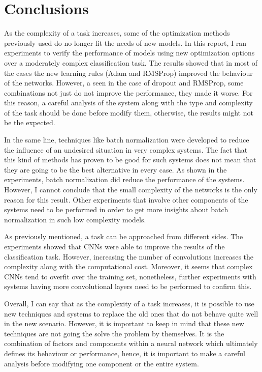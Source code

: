\documentclass{article}
\begin{document}
\section{Conclusions}
\label{sec:concl}

As the complexity of a task increases, some of the optimization methods previously used do no longer fit the needs of new models. In this report, I ran experiments to verify the performance of models using new optimization options over a moderately complex classification task. The results showed that in most of the cases the new learning rules (Adam and RMSProp) improved the behaviour of the networks. However, a seen in the case of dropout and RMSProp, some combinations not just do not improve the performance, they made it worse. For this reason, a careful analysis of the system along with the type and complexity of the task should be done before modify them, otherwise, the results might not be the expected.

In the same line, techniques like batch normalization were developed to reduce the influence of an undesired situation in very complex systems. The fact that this kind of methods has proven to be good for such systems does not mean that they are going to be the best alternative in every case. As shown in the experiments, batch normalization did reduce the performance of the systems. However, I cannot conclude that the small complexity of the networks is the only reason for this result. Other experiments that involve other components of the systems need to be performed in order to get more insights about batch normalization in such low complexity models.

As previously mentioned, a task can be approached from different sides. The experiments showed that CNNs were able to improve the results of the classification task. However, increasing the number of convolutions increases the complexity along with the computational cost. Moreover, it seems that complex CNNs tend to overfit over the training set, nonetheless, further experiments with systems having more convolutional layers need to be performed to confirm this.

Overall, I can say that as the complexity of a task increases, it is possible to use new techniques and systems to replace the old ones that do not behave quite well in the new scenario. However, it is important to keep in mind that these new techniques are not going the solve the problem by themselves. It is the combination of factors and components within a neural network which ultimately defines its behaviour or performance, hence, it is important to make a careful analysis before modifying one component or the entire system.


\end{document}
